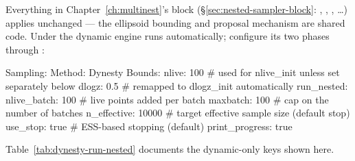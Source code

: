 Everything in Chapter~\ref{ch:multinest}'s  block
(\S\ref{sec:nested-sampler-block}: , , ,
\ldots) applies unchanged --- the ellipsoid bounding and proposal mechanism are shared
code. Under  the dynamic engine runs automatically; configure
its two phases through :

\begin{yamlwin}
Sampling:
  Method: Dynesty
  Bounds:
    nlive: 100              # used for nlive_init unless set separately below
    dlogz: 0.5                # remapped to dlogz_init automatically
    run_nested:
      nlive_batch: 100           # live points added per batch
      maxbatch: 100                 # cap on the number of batches
      n_effective: 10000              # target effective sample size (default stop)
      use_stop: true                    # ESS-based stopping (default)
      print_progress: true
\end{yamlwin}

Table~\ref{tab:dynesty-run-nested} documents the dynamic-only keys shown here.

